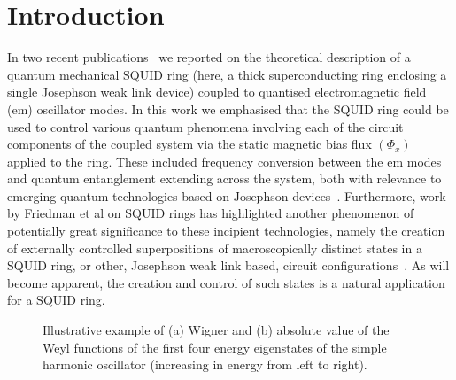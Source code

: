 \documentclass[12pt,a4paper,superscriptaddress,showpacs,floatfix,pra]{revtex4-2}
\begin{document}
\newpage

\section{Introduction}

In  two recent  publications~\cite{EverittSCVRPP01,EverittCSPPVR01} we
reported on the theoretical  description of a quantum mechanical SQUID
ring (here, a thick  superconducting ring enclosing a single Josephson
weak  link device)  coupled  to quantised  electromagnetic field  (em)
oscillator modes. In this work we emphasised that the SQUID ring could
be used  to control  various quantum phenomena  involving each  of the
circuit components of the coupled  system via the static magnetic bias
flux $\left(  \Phi _{x}\right) $  applied to the ring.  These included
frequency  conversion between  the em  modes and  quantum entanglement
extending across  the system, both with relevance  to emerging quantum
technologies              based              on              Josephson
devices~\cite{Chiorescu2003,Martinis2002,RouseHL95,SilvestriniRGE00,NakamuraCT97,NakamuraPT99,vanderWalWSHOLM00,lo_hk_1998,OrlandoMTvLLM99,MakhlinSS99,AverinNO90}. Furthermore,
work  by  Friedman  et  al  on SQUID  rings  has  highlighted  another
phenomenon  of  potentially  great  significance  to  these  incipient
technologies,   namely   the   creation   of   externally   controlled
superpositions of macroscopically distinct  states in a SQUID ring, or
other,       Josephson       weak       link      based,       circuit
configurations~\cite{FriedmanPCTL00}.  As  will  become apparent,  the
creation and  control of  such states is  a natural application  for a
SQUID ring.
\begin{figure}[!t]
\begin{center}
\end{center}
\caption{Illustrative example of (a)  Wigner and (b) absolute value of
the Weyl functions of the  first four energy eigenstates of the simple
harmonic oscillator (increasing in energy from left to right). }
\label{SHO}
\end{figure}
\end{document}
